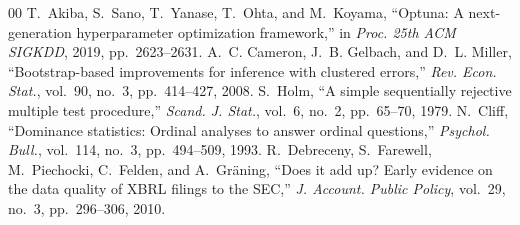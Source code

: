 \documentclass[conference]{IEEEtran}
\begin{document}
\begin{thebibliography}{00}
 T.~Akiba, S.~Sano, T.~Yanase, T.~Ohta, and M.~Koyama, ``Optuna: A next-generation hyperparameter optimization framework,'' in \emph{Proc. 25th ACM SIGKDD}, 2019, pp.~2623--2631.
 A.~C. Cameron, J.~B. Gelbach, and D.~L. Miller, ``Bootstrap-based improvements for inference with clustered errors,'' \emph{Rev. Econ. Stat.}, vol.~90, no.~3, pp.~414--427, 2008.
 S.~Holm, ``A simple sequentially rejective multiple test procedure,'' \emph{Scand. J. Stat.}, vol.~6, no.~2, pp.~65--70, 1979.
 N.~Cliff, ``Dominance statistics: Ordinal analyses to answer ordinal questions,'' \emph{Psychol. Bull.}, vol.~114, no.~3, pp.~494--509, 1993.
 R.~Debreceny, S.~Farewell, M.~Piechocki, C.~Felden, and A.~Gr\"aning, ``Does it add up? Early evidence on the data quality of XBRL filings to the SEC,'' \emph{J. Account. Public Policy}, vol.~29, no.~3, pp.~296--306, 2010.
\end{thebibliography}
\end{document}
